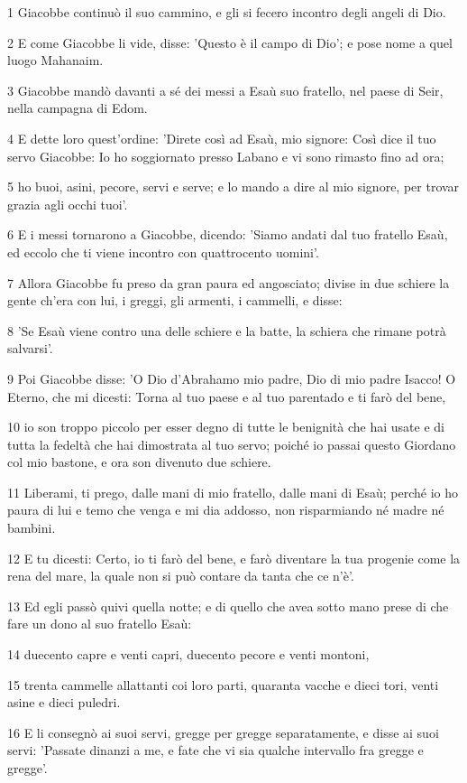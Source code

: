 \par 1 Giacobbe continuò il suo cammino, e gli si fecero incontro degli angeli di Dio.
\par 2 E come Giacobbe li vide, disse: 'Questo è il campo di Dio'; e pose nome a quel luogo Mahanaim.
\par 3 Giacobbe mandò davanti a sé dei messi a Esaù suo fratello, nel paese di Seir, nella campagna di Edom.
\par 4 E dette loro quest'ordine: 'Direte così ad Esaù, mio signore: Così dice il tuo servo Giacobbe: Io ho soggiornato presso Labano e vi sono rimasto fino ad ora;
\par 5 ho buoi, asini, pecore, servi e serve; e lo mando a dire al mio signore, per trovar grazia agli occhi tuoi'.
\par 6 E i messi tornarono a Giacobbe, dicendo: 'Siamo andati dal tuo fratello Esaù, ed eccolo che ti viene incontro con quattrocento uomini'.
\par 7 Allora Giacobbe fu preso da gran paura ed angosciato; divise in due schiere la gente ch'era con lui, i greggi, gli armenti, i cammelli, e disse:
\par 8 'Se Esaù viene contro una delle schiere e la batte, la schiera che rimane potrà salvarsi'.
\par 9 Poi Giacobbe disse: 'O Dio d'Abrahamo mio padre, Dio di mio padre Isacco! O Eterno, che mi dicesti: Torna al tuo paese e al tuo parentado e ti farò del bene,
\par 10 io son troppo piccolo per esser degno di tutte le benignità che hai usate e di tutta la fedeltà che hai dimostrata al tuo servo; poiché io passai questo Giordano col mio bastone, e ora son divenuto due schiere.
\par 11 Liberami, ti prego, dalle mani di mio fratello, dalle mani di Esaù; perché io ho paura di lui e temo che venga e mi dia addosso, non risparmiando né madre né bambini.
\par 12 E tu dicesti: Certo, io ti farò del bene, e farò diventare la tua progenie come la rena del mare, la quale non si può contare da tanta che ce n'è'.
\par 13 Ed egli passò quivi quella notte; e di quello che avea sotto mano prese di che fare un dono al suo fratello Esaù:
\par 14 duecento capre e venti capri, duecento pecore e venti montoni,
\par 15 trenta cammelle allattanti coi loro parti, quaranta vacche e dieci tori, venti asine e dieci puledri.
\par 16 E li consegnò ai suoi servi, gregge per gregge separatamente, e disse ai suoi servi: 'Passate dinanzi a me, e fate che vi sia qualche intervallo fra gregge e gregge'.
